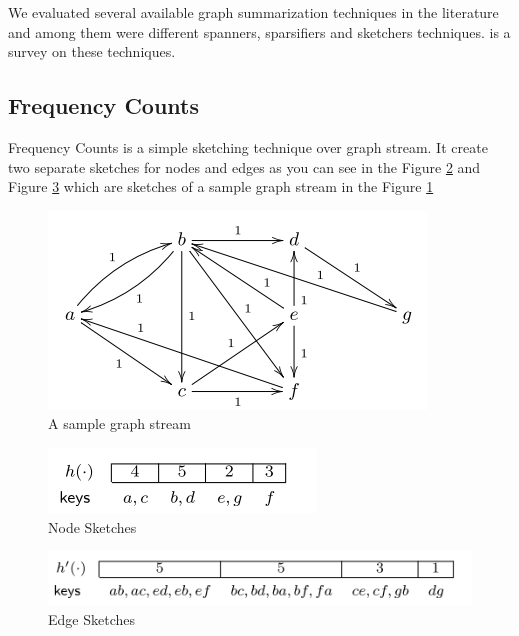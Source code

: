 \documentclass[12pt]{report}
\numberwithin{figure}{section}
\numberwithin{table}{section}
\begin{document}
We evaluated several available graph summarization techniques in the literature and among them were different spanners\cite{sparse spanners}, sparsifiers\cite{Spectral sparsification}  and sketchers techniques. \cite{Graph stream algorithms survey} is a survey on these techniques.    

\subsection{Frequency Counts}
Frequency Counts\cite{frequency counts} is a simple sketching technique over graph stream. It create two separate sketches for nodes and edges as you can see in the Figure \ref{fig:NodeSketches} and Figure \ref{fig:EdgeSketches} which are sketches of a sample graph stream in the Figure \ref{fig:SampleGraphStream}

\begin{figure}[H]
\centering
\includegraphics[scale=0.6]{images/SampleGraphStream}
\caption{A sample graph stream}
\label{fig:SampleGraphStream}
\end{figure}

\begin{figure}[H]
\centering
\includegraphics[scale=0.6]{images/NodeSketches}
\caption{Node Sketches}
\label{fig:NodeSketches}
\end{figure}

\begin{figure}[H]
\centering
\includegraphics[scale=0.6]{images/EdgeSketches}
\caption{Edge Sketches}
\label{fig:EdgeSketches}
\end{figure}
\end{document}

